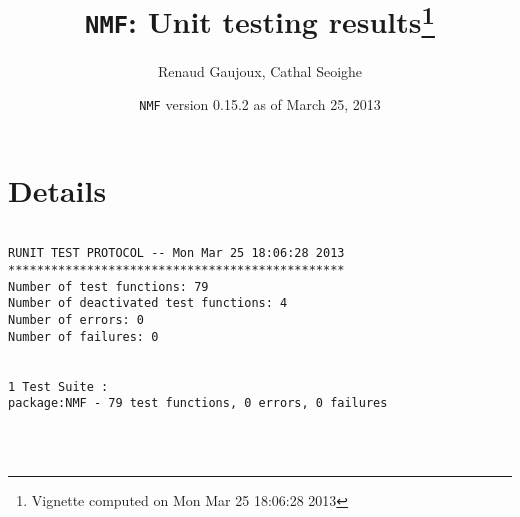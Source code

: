 \documentclass[10pt]{article}
\author{Renaud Gaujoux, Cathal Seoighe}
\title{\texttt{NMF}: Unit testing results\footnote{Vignette computed  on Mon Mar 25 18:06:28 2013}}
\date{\texttt{NMF} version 0.15.2 as of March 25, 2013}
\begin{document}
\maketitle

\section{Details}
\begin{verbatim}

RUNIT TEST PROTOCOL -- Mon Mar 25 18:06:28 2013 
*********************************************** 
Number of test functions: 79 
Number of deactivated test functions: 4 
Number of errors: 0 
Number of failures: 0 

 
1 Test Suite : 
package:NMF - 79 test functions, 0 errors, 0 failures




\end{verbatim}
\end{document}
